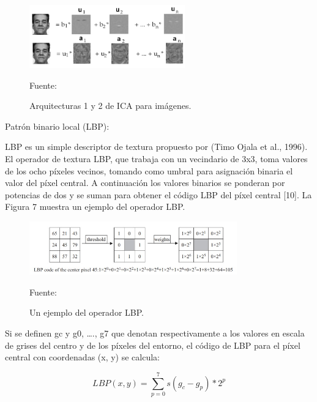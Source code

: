 \begin{enumerate}
\begin{figure}[ht]
\begin{center}
\includegraphics[width=0.6\textwidth]{Imagen20}
\end{center}
\begin{center}
\vskip -0.5cm
\caption{\small{Arquitecturas 1 y 2 de ICA para imágenes.}}
{\small{Fuente: \cite{FALTA}}}
\end{center}
\end{figure}

\vskip 3cm

{\bf\item Patrón binario local (LBP):} \vskip 0.1cm
LBP es un simple descriptor de textura propuesto por (Timo Ojala et al., 1996). El operador de textura LBP, que trabaja con un vecindario de 3x3, toma valores de los ocho píxeles vecinos, tomando como umbral para asignación binaria el valor del píxel central. A continuación los valores binarios se ponderan por potencias de dos y se suman para obtener el código LBP del píxel central [10]. La Figura 7 muestra un ejemplo del operador LBP.

\begin{figure}[ht]
\begin{center}
\includegraphics[width=0.8\textwidth]{Imagen21}
\end{center}
\begin{center}
\vskip -0.5cm
\caption{\small{Un ejemplo del operador LBP.}}
{\small{Fuente: \cite{FALTA}}}
\end{center}
\end{figure}

Si se definen gc y g0, …., g7  que denotan respectivamente a los valores en escala de grises del centro y de los píxeles del entorno, el código de LBP para el píxel central con coordenadas (x, y) se calcula: 

\begin{equation}
LBP(x,y)=\sum_{p=0}^{7}s(g_{c}-g_{p})*2^{p}
\end{equation}


\end{enumerate}
